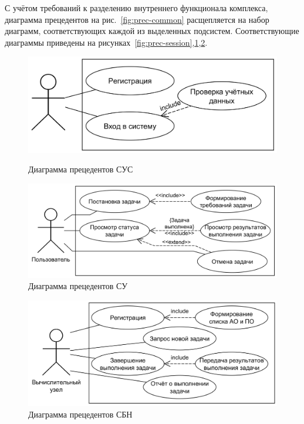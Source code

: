 \documentclass[a4paper,12pt]{report}
\numberwithin{equation}{section}
\begin{document}
  С учётом требований к разделению внутреннего функционала комплекса, диаграмма прецедентов на рис.~\ref{fig:prec-common}
  расщепляется на набор диаграмм, соответствующих каждой из выделенных подсистем.
  Соответствующие диаграммы приведены на рисунках~\ref{fig:prec-session},\ref{fig:prec-logic},\ref{fig:prec-balancer}.
  
  \begin{figure}
    \centering
    \begin{minipage}{.49\linewidth}
      \centering
      \includegraphics[width=\linewidth]{diagrams/session/usecase}
      \caption{Диаграмма прецедентов СУС}
      \label{fig:prec-session}
    \end{minipage}
    \hfill
    \begin{minipage}{.49\linewidth}
      \centering
      \includegraphics[width=\linewidth]{diagrams/logic/usecase}
      \caption{Диаграмма прецедентов СУ}
      \label{fig:prec-logic}
    \end{minipage}  
  \end{figure}
  
  \begin{figure}
    \centering
    \includegraphics[width=.6\linewidth]{diagrams/balancer/usecase}
    \caption{Диаграмма прецедентов СБН}
    \label{fig:prec-balancer}
  \end{figure}
  
\end{document}
